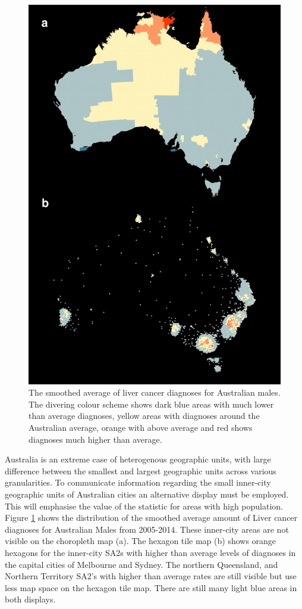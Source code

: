 \documentclass[conference,final,]{IEEEtran}
\makeatletter
\def\maxwidth{\ifdim\Gin@nat@width>\linewidth\linewidth
\else\Gin@nat@width\fi}
\let\Oldincludegraphics\includegraphics
\renewcommand{\includegraphics}[1]{\Oldincludegraphics[width=\maxwidth]{#1}}
\makeatother
\begin{document}
\begin{figure}
\centering
\includegraphics{paper_files/figure-latex/liver-1.pdf}
\caption{\label{fig:liver}The smoothed average of liver cancer diagnoses for Australian males. The divering colour scheme shows dark blue areas with much lower than average diagnoses, yellow areas with diagnoses around the Australian average, orange with above average and red shows diagnoses much higher than average.}
\end{figure}

Australia is an extreme case of heterogenous geographic units, with large difference between the smallest and largest geographic units across various granularities.
To communicate information regarding the small inner-city geographic units of Australian cities an alternative display must be employed. This will emphasise the value of the statistic for areas with high population. Figure \ref{fig:liver} shows the distribution of the smoothed average amount of Liver cancer diagnoses for Australian Males from 2005-2014.
These inner-city areas are not visible on the choropleth map (a). The hexagon tile map (b) shows orange hexagons for the inner-city SA2s with higher than average levels of diagnoses in the capital cities of Melbourne and Sydney. The northern Queensland, and Northern Territory SA2's with higher than average rates are still visible but use less map space on the hexagon tile map. There are still many light blue areas in both displays.
\end{document}

